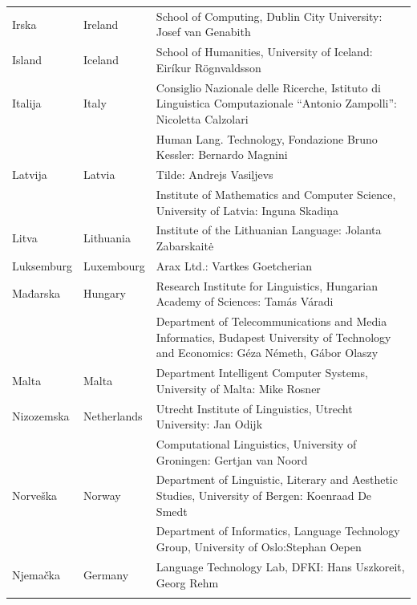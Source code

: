 \begin{longtable}{llp{115mm}}
   Irska & \textcolor{grey1}{Ireland} & School of Computing, Dublin City University: Josef van Genabith\\ \addlinespace
  Island & \textcolor{grey1}{Iceland} & School of Humanities, University of Iceland: Eiríkur Rögnvaldsson\\ \addlinespace
  Italija & \textcolor{grey1}{Italy} & Consiglio Nazionale delle Ricerche, Istituto di Linguistica Computazionale \newline “Antonio Zampolli”: Nicoletta Calzolari\\ \addlinespace
  & & Human Lang. Technology, Fondazione Bruno Kessler: Bernardo Magnini\\ \addlinespace 
  Latvija & \textcolor{grey1}{Latvia} & Tilde: Andrejs Vasiļjevs\\ \addlinespace 
  & & Institute of Mathematics and Computer Science, University of Latvia: Inguna Skadiņa\\ \addlinespace
  Litva & \textcolor{grey1}{Lithuania} & Institute of the Lithuanian Language: Jolanta Zabarskaitė\\ \addlinespace
  Luksemburg & \textcolor{grey1}{Luxembourg} & Arax Ltd.: Vartkes Goetcherian\\ \addlinespace
  Mađarska & \textcolor{grey1}{Hungary} & Research Institute for Linguistics, Hungarian Academy of Sciences: Tamás Váradi\\  \addlinespace
  & & Department of Telecommunications and Media Informatics, Budapest University of Technology and Economics: Géza Németh, Gábor Olaszy\\ \addlinespace
  Malta & \textcolor{grey1}{Malta} & Department Intelligent Computer Systems, University of Malta: Mike Rosner\\ \addlinespace
   Nizozemska & \textcolor{grey1}{Netherlands} & Utrecht Institute of Linguistics, Utrecht University: Jan Odijk\\ \addlinespace 
  & & Computational Linguistics, University of Groningen: Gertjan van Noord\\ \addlinespace
  Norveška & \textcolor{grey1}{Norway} & Department of Linguistic, Literary and Aesthetic Studies, University of Bergen: Koenraad De Smedt\\ \addlinespace 
  & & Department of Informatics, Language Technology Group, University of Oslo:\newline Stephan Oepen \\ \addlinespace
  Njemačka & \textcolor{grey1}{Germany} & Language Technology Lab, DFKI: Hans Uszkoreit, Georg Rehm\\ \addlinespace

\end{longtable}
